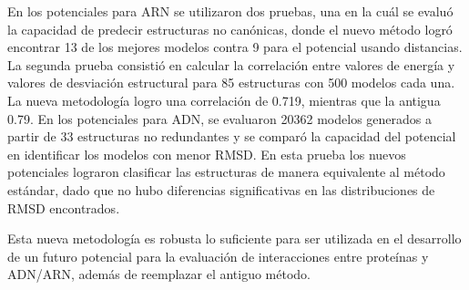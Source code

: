 \begin{singlespace}
En los potenciales para ARN se utilizaron dos pruebas, una en la cuál se evaluó la capacidad de 
predecir estructuras no canónicas, donde el nuevo método logró encontrar 13 de los mejores modelos 
contra 9 para el potencial usando distancias.
La segunda prueba consistió en calcular la correlación entre valores de energía y valores de desviación
estructural para 85 estructuras con 500 modelos cada una. 
La nueva metodología logro una correlación de 0.719, mientras que la antigua 0.79.
En los potenciales para ADN, se evaluaron 20362 modelos generados a partir de 33 estructuras no 
redundantes y se comparó la capacidad del potencial en identificar los modelos con menor RMSD.
En esta prueba los nuevos potenciales lograron clasificar las estructuras de manera equivalente 
al método estándar, dado que no hubo diferencias significativas en las distribuciones de RMSD encontrados.
\\
\par
Esta nueva metodología es robusta lo suficiente para ser utilizada en el desarrollo de un futuro 
potencial para la evaluación de interacciones entre proteínas y ADN/ARN, además de reemplazar el 
antiguo método. 
\end{singlespace}
